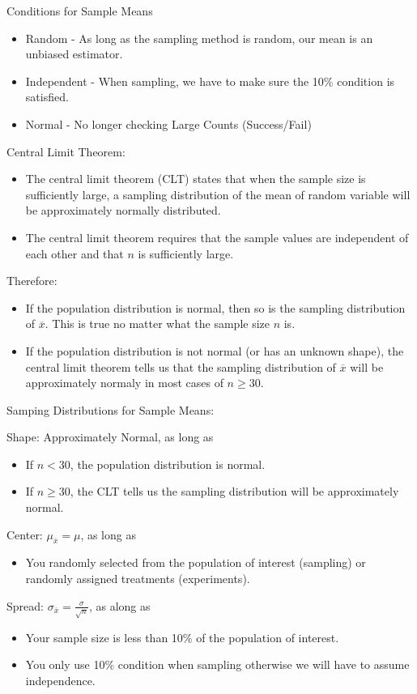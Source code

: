 \documentclass[../stats.tex]{subfiles}
\begin{document}
Conditions for Sample Means 
\begin{itemize}
    \item Random - As long as the sampling method is random, our mean is an unbiased estimator.
    \item Independent - When sampling, we have to make sure the 10\% condition is satisfied.
    \item Normal - No longer checking Large Counts (Success/Fail)
\end{itemize}
Central Limit Theorem:
\begin{itemize}
    \item The central limit theorem (CLT) states that when the sample size is sufficiently large, a sampling distribution of the mean of random variable will be approximately normally distributed.
    \item The central limit theorem requires that the sample values are independent of each other and that $n$ is sufficiently large.
\end{itemize}

Therefore:
\begin{itemize}
    \item If the population distribution is normal, then so is the sampling distribution of $\overline{x}$. This is true no matter what the sample size $n$ is.
    \item If the population distribution is not normal (or has an unknown shape), the central limit theorem tells us that the sampling distribution of $\overline{x}$ will be approximately normaly in most cases of $n\geq 30$.
\end{itemize}

Samping Distributions for Sample Means:

Shape: Approximately Normal, as long as 
\begin{itemize}
    \item If $n<30$, the population distribution is normal.
    \item If $n\geq 30$, the CLT tells us the sampling distribution will be approximately normal.
\end{itemize}

Center: $\mu_{\overline{x}}=\mu$, as long as 
\begin{itemize}
    \item You randomly selected from the population of interest (sampling) or randomly assigned treatments (experiments).
\end{itemize}

Spread: $\sigma_{\overline{x}}=\frac{\sigma}{\sqrt{n}}$, as along as 
\begin{itemize}
    \item Your sample size is less than 10\% of the population of interest.
    \item You only use 10\% condition when sampling otherwise we will have to assume independence.
\end{itemize}
\end{document}
